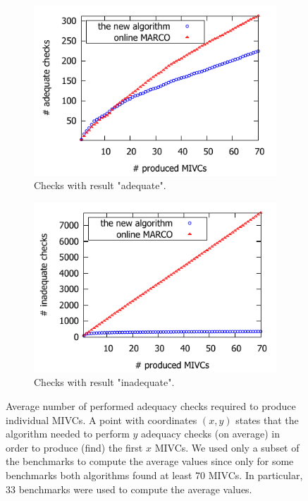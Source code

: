 \begin{figure}[!t]
\centering
\begin{subfigure}{.5\textwidth}
  \centering
  \includegraphics[scale=0.8]{./plots/adequate_checks_per_mivc_70.pdf}
  \caption{Checks with result "adequate".}
  \label{res:adequate_checks}
\end{subfigure}%
\begin{subfigure}{.5\textwidth}
  \centering
  \includegraphics[scale=0.8]{./plots/inadequate_checks_per_mivc_70.pdf}
  \caption{Checks with result "inadequate".}
  \label{res:inadequate_checks}
\end{subfigure}
\caption{Average number of performed adequacy checks required to produce individual MIVCs. A point with coordinates $(x,y)$ states that the algorithm needed to perform $y$ adequacy checks (on average) in order to produce (find) the first $x$ MIVCs. We used
only a subset of the benchmarks to compute the average values since only for
some benchmarks both algorithms found at least 70 MIVCs. In particular, 33 benchmarks were used to compute the average values.}
\label{res:checks}
\end{figure}
